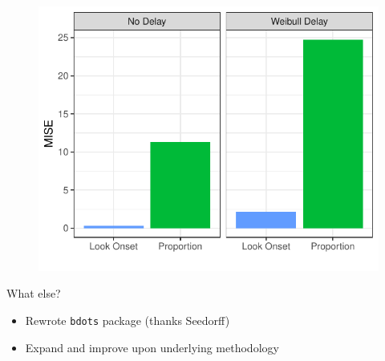 \documentclass{beamer}
\newcommand{\xt}{\texttt}
\providecommand{\cn}[1]{\textcolor{blue}{#1}}
\begin{document}
%
%

\begin{frame}
\begin{figure}
\centering
\includegraphics{mise_bar.pdf}
\end{figure}
\end{frame}



\begin{frame}{What else?}

\begin{itemize}
\item Rewrote \xt{bdots} package (thanks Seedorff)
\item Expand and improve upon underlying methodology
\end{itemize}
\end{frame}
\end{document}

